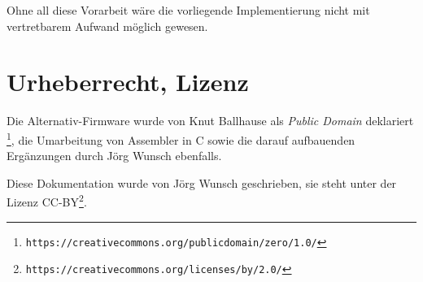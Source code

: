 \documentclass[a5paper,twoside]{article}
\begin{document}
Ohne all diese Vorarbeit wäre die vorliegende Implementierung nicht
mit vertretbarem Aufwand möglich gewesen.

\section {
  Urheberrecht, Lizenz
}

Die Alternativ-Firmware wurde von Knut Ballhause als \emph{Public Domain}
deklariert \footnote{\texttt{https://creativecommons.org/publicdomain/zero/1.0/}}, die
Umarbeitung von Assembler in C sowie die darauf aufbauenden Ergänzungen
durch Jörg Wunsch ebenfalls.

Diese Dokumentation wurde von Jörg Wunsch geschrieben, sie steht unter
der Lizenz CC-BY\footnote{\texttt{https://creativecommons.org/licenses/by/2.0/}}.
\end{document}
